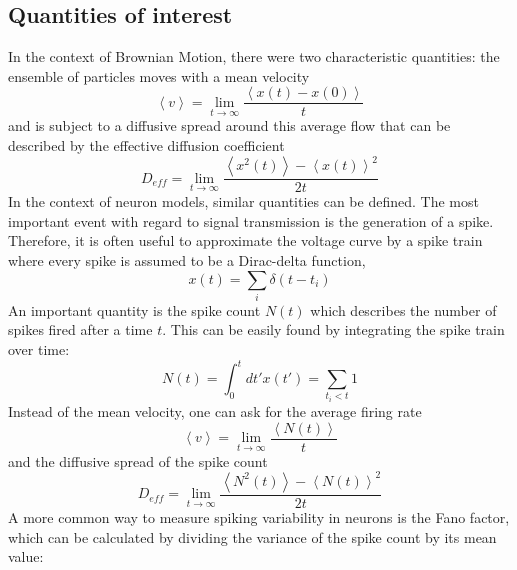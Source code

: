 \documentclass[12pt,a4paper]{article}
\begin{document}
\subsection{Quantities of interest}\label{quant}
In the context of Brownian Motion, there were two characteristic quantities: the ensemble of particles moves with a mean velocity
\begin{equation}
\left\langle v\right\rangle =\lim_{t\rightarrow\infty}\frac{\left\langle x(t)-x(0) \right\rangle}{t}
\end{equation}
and is subject to a diffusive spread around this average flow that can be described by the effective diffusion coefficient
\begin{equation}
D_{eff}=\lim_{t\rightarrow\infty}\frac{\left\langle x^2(t) \right\rangle-\left\langle x(t)\right\rangle ^2}{2t}
\end{equation}
In the context of neuron models, similar quantities can be defined. The most important event with regard to signal transmission is the generation of a spike. Therefore, it is often useful to approximate the voltage curve by a spike train where every spike is assumed to be a Dirac-delta function,
\begin{equation}
x(t)=\sum_{i}\delta(t-t_i)
\end{equation}
An important quantity is the spike count $N(t)$ which describes the number of spikes fired after a time $t$. This can be easily found by integrating the spike train over time:
\begin{equation}
N(t)=\int_{0}^{t}dt'x(t')=\sum_{t_i<t} 1
\end{equation}
Instead of the mean velocity, one can ask for the average firing rate
\begin{equation}\label{vdef}
\left\langle v\right\rangle =\lim_{t\rightarrow\infty}\frac{\left\langle N(t) \right\rangle}{t}
\end{equation} 
and the diffusive spread of the spike count
\begin{equation}\label{deffdef}
D_{eff}=\lim_{t\rightarrow\infty}\frac{\left\langle N^2(t) \right\rangle-\left\langle N(t)\right\rangle ^2}{2t}
\end{equation}
A more common way to measure spiking variability in neurons is the Fano factor, which can be calculated by dividing the variance of the spike count by its mean value:
\end{document}
